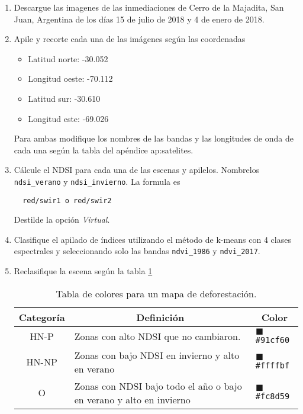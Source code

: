 \begin{enumerate}
\item Descargue las imagenes de las inmediaciones de Cerro de la Majadita, San Juan, Argentina de los días 15 de julio de 2018 y 4 de enero de 2018.

\item Apile y recorte cada una de las imágenes según las coordenadas

\begin{itemize}
    \item Latitud norte: -30.052
    \item Longitud oeste: -70.112
    \item Latitud sur: -30.610
    \item Longitud este: -69.026
\end{itemize}

Para ambas modifique los nombres de las bandas y las longitudes de onda de cada una según la tabla del apéndice ap:satelites.

\item Cálcule el NDSI para cada una de las escenas y apilelos. Nombrelos \texttt{ndsi\_verano} y \texttt{ndsi\_invierno}. La formula es

\begin{verbatim}
  red/swir1 o red/swir2
\end{verbatim}

Destilde la opción \emph{Virtual}.

\item Clasifique el apilado de índices utilizando el método de k-means con 4 clases espectrales y seleccionando solo las bandas \texttt{ndvi\_1986} y \texttt{ndvi\_2017}.

\item Reclasifique la escena según la tabla \ref{tab:def}

\begin{table}[]
\centering
\begin{tabular}{@{}cll@{}}
\toprule
Categoría & \multicolumn{1}{c}{Definición}        & \multicolumn{1}{c}{Color}          \\ \midrule
HN-P      & Zonas con alto NDSI que no cambiaron. & \textcolor{P1}{$\blacksquare$}\texttt{\#91cf60} \\
HN-NP     & Zonas con bajo NDSI en invierno y alto en verano  & \textcolor{P2}{$\blacksquare$}\texttt{\#ffffbf} \\
O         & Zonas con NDSI bajo todo el año o bajo en verano y alto en invierno        & \textcolor{P3}{$\blacksquare$}\texttt{\#fc8d59} \\ \bottomrule
\end{tabular}
\caption{Tabla de colores para un mapa de deforestación.}
\label{tab:def}
\end{table}


\end{enumerate}
